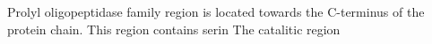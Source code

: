 Prolyl oligopeptidase family region is located towards the C-terminus of the protein chain. This region contains serin The catalitic region 
